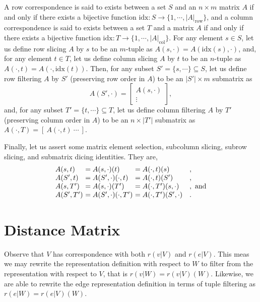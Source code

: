 \documentclass{article}
\begin{document}
A row correspondence is said to exists between a set \(S\) and an \(n \times m\) matrix \(A\) if and only if there exists a bijective function \(\mathrm{idx} : S \to \{1, \cdots, |A|_{\mathrm{row}}\}\), and a column correspondence is said to exists between a set \(T\) and a matrix \(A\) if and only if there exists a bijective function \(\mathrm{idx} : T \to \{1, \cdots, |A|_{\mathrm{col}}\}\). For any element \(s \in S\), let us define row slicing \(A\) by \(s\) to be an \(m\)-tuple as \(A(s, \cdot) = A(\mathrm{idx}(s), \cdot)\), and, for any element \(t \in T\), let us define column slicing \(A\) by \(t\) to be an \(n\)-tuple as \(A(\cdot, t) = A(\cdot, \mathrm{idx}(t))\). Then, for any subset \(S' = \{s, \cdots\} \subseteq S\), let us define row filtering \(A\) by \(S'\) (preserving row order in \(A\)) to be an \(|S'| \times m\) submatrix as
\[
	A(S', \cdot) = \left[
	\begin{array}{c}
		A(s, \cdot) \\
		\vdots
	\end{array}
	\right] ,
\]
and, for any subset \(T' = \{t, \cdots\} \subseteq T\), let us define column filtering \(A\) by \(T'\) (preserving column order in \(A\)) to be an \(n \times |T'|\) submatrix as \(A(\cdot, T) = \left[\ A(\cdot, t)\ \cdots\ \right]\).

Finally, let us assert some matrix element selection, subcolumn slicing, subrow slicing, and submatrix dicing identities. They are,
\[
\begin{array}{l@{\ }l@{\ }ll}
	A(s, t) &= A(s, \cdot)(t) &= A(\cdot, t)(s) &, \\
	A(S', t) &= A(S', \cdot)(\cdot, t) &= A(\cdot, t)(S') &, \\
	A(s, T') &= A(s, \cdot)(T') &= A(\cdot, T')(s, \cdot) &, \text{ and} \\
	A(S', T') &= A(S', \cdot)(\cdot, T') &= A(\cdot, T')(S', \cdot) &.
\end{array}
\]

\section{Distance Matrix}

Observe that \(V\) has correspondence with both \(r(v|V)\) and \(r(e|V)\). This meas we may rewrite the representation definition with respect to \(W\) to filter from the representation with respect to \(V\), that is \(r(v|W) = r(v|V)(W)\). Likewise, we are able to rewrite the edge representation definition in terms of tuple filtering as \(r(e|W) = r(e|V)(W)\).
\end{document}
